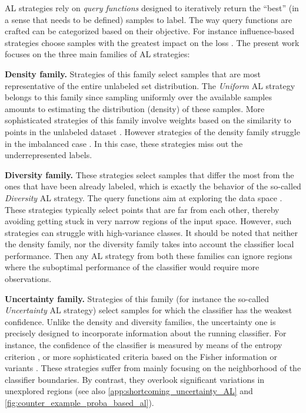 \documentclass[twoside]{article}
\theoremstyle{definition}
\theoremstyle{remark}
\begin{document}
AL strategies rely on \emph{query functions} designed to iteratively return the ``best'' (in a sense that needs to be defined) samples to label.
%
The way query functions are crafted can be categorized based on their objective. For instance influence-based strategies choose samples with the greatest impact on the loss \citep{wangDeepActiveLearning2022}. 
%
The present work focuses on the three main families of AL strategies:

\textbf{Density family.} Strategies of this family select samples that are most representative of the entire unlabeled set distribution. 
    The \emph{Uniform} AL strategy belongs to this family since sampling uniformly over the available samples amounts to estimating the distribution (density) of these samples.
    More sophisticated strategies of this family involve weights based on the similarity to points in the unlabeled dataset \citep[Sec. 3.6]{settlesActiveLearningLiterature2009}. 
    However strategies of the density family struggle in the imbalanced case \citep{chenSurveyImbalancedLearning2024, gaoComprehensiveSurveyImbalanced2026}. In this case, these strategies miss out the underrepresented labels.

\textbf{Diversity family.} These strategies select samples that differ the most from the ones that have been already labeled, which is exactly the behavior of the so-called \emph{Diversity} AL strategy.
    The query functions aim at exploring the data space \citep{krauseNonmyopicActiveLearning2007, elreedyNovelActiveLearning2019}.
    These strategies typically select points that are far from each other, thereby avoiding getting stuck in very narrow regions of the input space. However, such strategies can struggle with high-variance classes.
    It should be noted that neither the density family, nor the diversity family takes into account the classifier local performance. Then any AL strategy from both these families can ignore regions where the suboptimal performance of the classifier would require more observations.

\textbf{Uncertainty family.} Strategies of this family (for instance the so-called \emph{Uncertainty} AL strategy) select samples for which the classifier has the weakest confidence.
    Unlike the density and diversity families, the uncertainty one is precisely designed to incorporate information about the running classifier. 
    For instance, the confidence of the classifier is measured by means of the entropy criterion \citep{settlesActiveLearningLiterature2009, wangCostEffectiveActiveLearning2017}, or more sophisticated criteria based on the Fisher information or variants \citep{kirschUnifyingApproachesActive2022, gulFisherMaskEnhancingNeural2024}.
    These strategies suffer from mainly focusing on the neighborhood of the classifier boundaries. By contrast, they overlook significant variations in unexplored regions (see also \cref{app:shortcoming_uncertainty_AL} and \cref{fig:counter_example_proba_based_al}).
\end{document}
